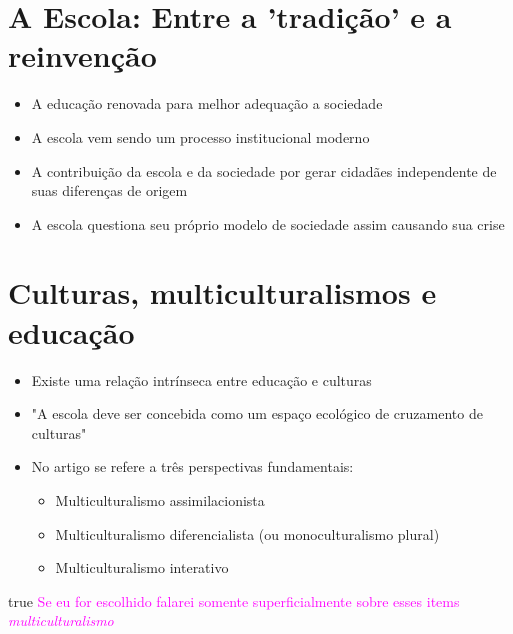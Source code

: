 \documentclass[]{beamer}
\newcommand{\obs}[1]{{
  \ifdefined\DRAFT
    \textcolor{magenta}{#1}
  \fi
}}
\def\DRAFT{true}
\begin{document}
  \section{A Escola: Entre a 'tradição' e a reinvenção}

  \begin{frame}{\secname *}
    \begin{itemize}
      \item
        A educação renovada para melhor adequação a sociedade

      \item
        A escola vem sendo um processo institucional moderno

      \item
        A contribuição da escola e da sociedade por gerar cidadães independente
        de suas diferenças de origem

      \item
        A escola questiona seu próprio modelo de sociedade assim causando sua
        crise
    \end{itemize}
  \end{frame}

  \section{Culturas, multiculturalismos e educação}

  \begin{frame}{\secname *}
    \begin{itemize}
      \item
        Existe uma relação intrínseca entre educação e culturas

      \item
        "A escola deve ser concebida como um espaço ecológico de cruzamento de
        culturas"

      \item
        No artigo se refere a três perspectivas fundamentais:
        \begin{itemize}
          \item Multiculturalismo assimilacionista
          \item Multiculturalismo diferencialista (ou monoculturalismo plural)
          \item Multiculturalismo interativo
        \end{itemize}
    \end{itemize}

    \obs{
      Se eu for escolhido falarei somente superficialmente sobre esses items
      \emph{multiculturalismo}
    }
  \end{frame}
\end{document}
